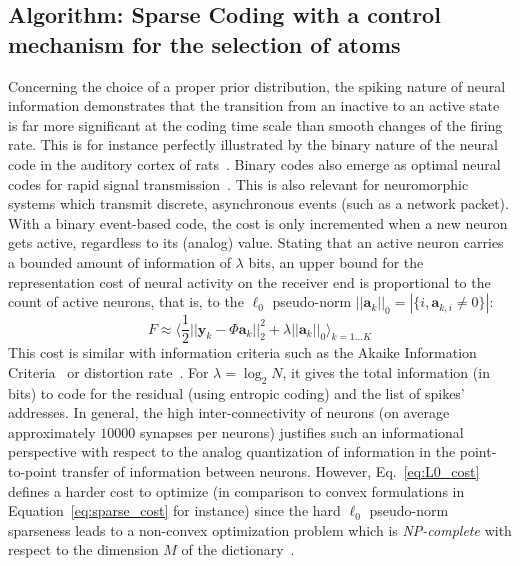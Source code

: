 \documentclass[draft]{article} %
\newcommand{\coef}{\mathbf{a}} %
\newcommand{\image}{\mathbf{y}} %
\newcommand{\dico}{\Phi} %
\newcommand{\enscond}[2]{\lbrace #1, #2 \rbrace}
\newcommand{\norm}[1]{|\!| #1 |\!|}
\newcommand{\abs}[1]{\left|#1\right|}
\newcommand{\seeEq}[1]{Eq.~\ref{eq:#1}}%
\begin{document}
\subsection{Algorithm: Sparse Coding with a control mechanism for the selection of atoms}
Concerning the choice of a proper prior distribution, the spiking nature of neural information demonstrates that the transition from an inactive to an active state is far more significant at the coding time scale than smooth changes of the firing rate. This is for instance perfectly illustrated by the binary nature of the neural code in the auditory cortex of rats~\citep{DeWeese03}. Binary codes also emerge as optimal neural codes for rapid signal transmission~\citep{Bethge03}. This is also relevant for neuromorphic systems which transmit discrete, asynchronous events (such as a network packet). With a binary event-based code, the cost is only incremented when a new neuron gets active, regardless to its (analog) value. Stating that an active neuron carries a bounded amount of information of $\lambda$ bits, an upper bound for the representation cost of neural activity on the receiver end is proportional to the count of active neurons, that is, to the $\ell_0$ pseudo-norm $\norm{\coef_{k}}_0 = \abs{\enscond{i}{\coef_{k, i} \neq 0}}$:%
\begin{equation}%
F \approx  \langle \frac{1}{2} \norm{\image_k - \dico \coef_{k}}_2^2 + \lambda\norm{\coef_{k}}_0 \rangle_{k = 1 \ldots K}%
\label{eq:L0_cost}%
\end{equation}%
This cost is similar with information criteria such as the Akaike Information Criteria~\citep{Akaike74} or distortion rate~\citep[p.~571]{Mallat98}. For $\lambda=\log_2 N$, it gives the total information (in bits) to code for the residual (using entropic coding) and the list of spikes' addresses. In general, the high inter-connectivity of neurons (on average approximately $10000$ synapses per neurons) justifies such an informational perspective with respect to the analog quantization of information in the point-to-point transfer of information between neurons.
However, \seeEq{L0_cost} defines a harder cost to optimize (in comparison to convex formulations in Equation~\ref{eq:sparse_cost} for instance) since the hard $\ell_0$ pseudo-norm sparseness leads to a non-convex optimization problem which is \emph{NP-complete} with respect to the dimension $M$ of the dictionary~\citep[p.~418]{Mallat98}.
\end{document}
